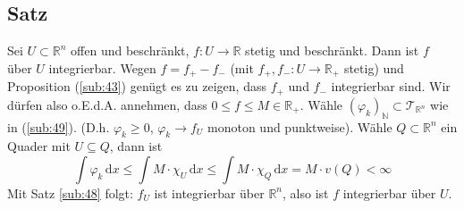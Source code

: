 \subsection[Satz: Stetige, beschränkte Funktionen sind über offene, beschränkte Mengen integrierbar]{Satz} %
\label{sub:410}
Sei $U \subset \mathds{R}^n$ offen und beschränkt, $f : U \to \mathds{R}$ stetig und beschränkt. Dann ist $f$ über $U$ integrierbar.
Wegen $f = f_+ - f_-$ (mit $f_+,f_- : U \to \mathds{R}_+$ stetig) und Proposition (\ref{sub:43}) genügt es zu zeigen, dass $f_+$ und $f_-$ integrierbar sind. Wir dürfen also o.E.d.A. annehmen, dass $0\le f\le M \in \mathds{R}_+$. Wähle $(\varphi_k)_\mathds{N} \subset \mathcal{T}_{\mathds{R}^n}$ wie in
(\ref{sub:49}). (D.h. $\varphi_k \ge 0$, $\varphi_k \to f_U$ monoton und punktweise). Wähle $Q \subset \mathds{R}^n$ ein Quader mit $U \subseteq Q$, dann ist
\[
	\int\! \varphi_k  \, \mathrm{d}x  \le \int\! M \cdot \chi_U  \, \mathrm{d}x  \le \int\! M \cdot \chi_Q  \, \mathrm{d}x = M \cdot v(Q) < \infty
\]
Mit Satz \ref{sub:48} folgt: $f_U$ ist integrierbar über $\mathds{R}^n$, also ist $f$ integrierbar über $U$. \bewende

